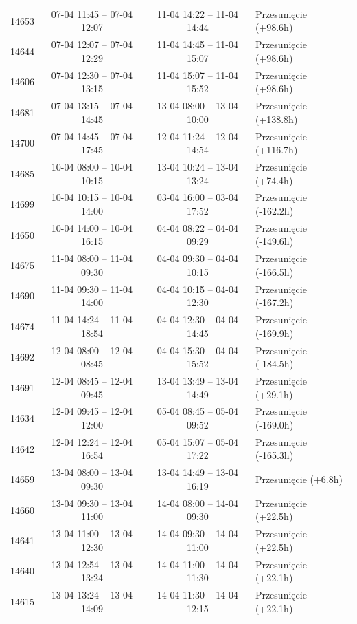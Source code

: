 \begin{table}[htbp]
\begin{tabular}{|r|c|c|l|}
14653 & 07-04 11:45 -- 07-04 12:07 & 11-04 14:22 -- 11-04 14:44 & Przesunięcie (+98.6h) \\ 
14644 & 07-04 12:07 -- 07-04 12:29 & 11-04 14:45 -- 11-04 15:07 & Przesunięcie (+98.6h) \\ 
14606 & 07-04 12:30 -- 07-04 13:15 & 11-04 15:07 -- 11-04 15:52 & Przesunięcie (+98.6h) \\ 
14681 & 07-04 13:15 -- 07-04 14:45 & 13-04 08:00 -- 13-04 10:00 & Przesunięcie (+138.8h) \\ 
14700 & 07-04 14:45 -- 07-04 17:45 & 12-04 11:24 -- 12-04 14:54 & Przesunięcie (+116.7h) \\ 
14685 & 10-04 08:00 -- 10-04 10:15 & 13-04 10:24 -- 13-04 13:24 & Przesunięcie (+74.4h) \\ 
14699 & 10-04 10:15 -- 10-04 14:00 & 03-04 16:00 -- 03-04 17:52 & Przesunięcie (-162.2h) \\ 
14650 & 10-04 14:00 -- 10-04 16:15 & 04-04 08:22 -- 04-04 09:29 & Przesunięcie (-149.6h) \\ 
14675 & 11-04 08:00 -- 11-04 09:30 & 04-04 09:30 -- 04-04 10:15 & Przesunięcie (-166.5h) \\ 
14690 & 11-04 09:30 -- 11-04 14:00 & 04-04 10:15 -- 04-04 12:30 & Przesunięcie (-167.2h) \\ 
14674 & 11-04 14:24 -- 11-04 18:54 & 04-04 12:30 -- 04-04 14:45 & Przesunięcie (-169.9h) \\ 
14692 & 12-04 08:00 -- 12-04 08:45 & 04-04 15:30 -- 04-04 15:52 & Przesunięcie (-184.5h) \\ 
14691 & 12-04 08:45 -- 12-04 09:45 & 13-04 13:49 -- 13-04 14:49 & Przesunięcie (+29.1h) \\ 
14634 & 12-04 09:45 -- 12-04 12:00 & 05-04 08:45 -- 05-04 09:52 & Przesunięcie (-169.0h) \\ 
14642 & 12-04 12:24 -- 12-04 16:54 & 05-04 15:07 -- 05-04 17:22 & Przesunięcie (-165.3h) \\ 
14659 & 13-04 08:00 -- 13-04 09:30 & 13-04 14:49 -- 13-04 16:19 & Przesunięcie (+6.8h) \\ 
14660 & 13-04 09:30 -- 13-04 11:00 & 14-04 08:00 -- 14-04 09:30 & Przesunięcie (+22.5h) \\ 
14641 & 13-04 11:00 -- 13-04 12:30 & 14-04 09:30 -- 14-04 11:00 & Przesunięcie (+22.5h) \\ 
14640 & 13-04 12:54 -- 13-04 13:24 & 14-04 11:00 -- 14-04 11:30 & Przesunięcie (+22.1h) \\ 
14615 & 13-04 13:24 -- 13-04 14:09 & 14-04 11:30 -- 14-04 12:15 & Przesunięcie (+22.1h) \\ 

\end{tabular}
\end{table}
